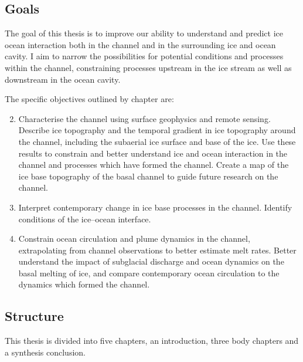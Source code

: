  
\subsection{Goals} \label{sec:objectives}

The goal of this thesis is to improve our ability to understand and predict ice ocean interaction both in the channel and in the surrounding ice and ocean cavity. I aim to narrow the possibilities for potential conditions and processes within the channel, constraining processes upstream in the ice stream as well as downstream in the ocean cavity. 

The specific objectives outlined by chapter are:
\begin{enumerate}
    \setcounter{enumi}{1}
    \item Characterise the channel using surface geophysics and remote sensing. Describe ice topography and the temporal gradient in ice topography around the channel, including the subaerial ice surface and base of the ice. Use these results to constrain and better understand ice and ocean interaction in the channel and processes which have formed the channel. Create a map of the ice base topography of the basal channel to guide future research on the channel.
    \item Interpret contemporary change in ice base processes in the channel. Identify conditions of the ice--ocean interface. 
    \item Constrain ocean circulation and plume dynamics in the channel, extrapolating from channel observations to better estimate melt rates. Better understand the impact of subglacial discharge and ocean dynamics on the basal melting of ice, and compare contemporary ocean circulation to the dynamics which formed the channel. 
\end{enumerate}


\subsection{Structure} \label{sec:structure}


This thesis is divided into five chapters, an introduction, three body chapters and a synthesis conclusion. 
 

